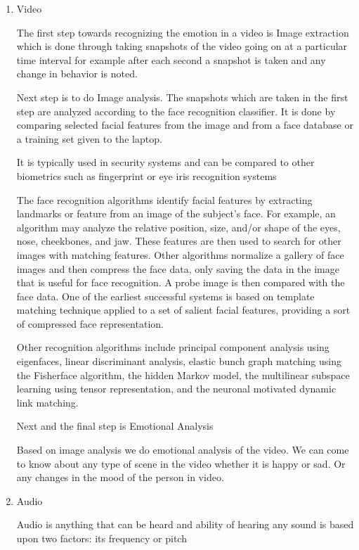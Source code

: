 \begin{enumerate}
	\item Video
	
	The first step towards recognizing the emotion in a video is Image extraction which is done through taking snapshots of the video going on at a particular time interval for example after each second a snapshot is taken and any change in behavior is noted.
	
	Next step is to do Image analysis. The snapshots which are taken in the first step are analyzed according to the face recognition classifier. It is done by comparing selected facial features from the image and from a face database or a training set given to the laptop.
	
	It is typically used in security systems and can be compared to other biometrics such as fingerprint or eye iris recognition systems
	
	The face recognition algorithms identify facial features by extracting landmarks or feature from an image of the subject's face. For example, an algorithm may analyze the relative position, size, and/or shape of the eyes, nose, cheekbones, and jaw. These features are then used to search for other images with matching features. Other algorithms normalize a gallery of face images and then compress the face data, only saving the data in the image that is useful for face recognition. A probe image is then compared with the face data. One of the earliest successful systems is based on template matching technique applied to a set of salient facial features, providing a sort of compressed face representation.
	
	Other recognition algorithms include principal component analysis using eigenfaces, linear discriminant analysis, elastic bunch graph matching using the Fisherface algorithm, the hidden Markov model, the multilinear subspace learning using tensor representation, and the neuronal motivated dynamic link matching.
	
	Next and the final step is Emotional Analysis
	
	Based on image analysis we do emotional analysis of the video. We can come to know about any type of scene in the video whether it is happy or sad. Or any changes in the mood of the person in video.
	
	\item Audio
	
	Audio is anything that can be heard and ability of hearing any sound is based upon two factors: its frequency or pitch
	

\end{enumerate}
